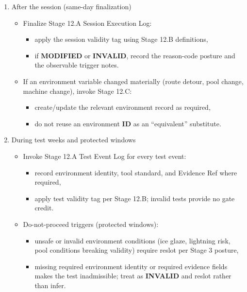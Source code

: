 \documentclass[10pt]{article}
\begin{document}
\begin{enumerate}
\item After the session (same-day finalization)
  \begin{itemize}
  \item Finalize Stage 12.A Session Execution Log:
    \begin{itemize}
    \item apply the session validity tag using Stage 12.B definitions,
    \item if \textbf{MODIFIED} or \textbf{INVALID}, record the reason-code posture and the observable trigger notes.
    \end{itemize}
  \item If an environment variable changed materially (route detour, pool change, machine change), invoke Stage 12.C:
    \begin{itemize}
    \item create/update the relevant environment record as required,
    \item do not reuse an environment \textbf{ID} as an “equivalent” substitute.
    \end{itemize}
  \end{itemize}

\item During test weeks and protected windows
  \begin{itemize}
  \item Invoke Stage 12.A Test Event Log for every test event:
    \begin{itemize}
    \item record environment identity, tool standard, and Evidence Ref where required,
    \item apply test validity tag per Stage 12.B; invalid tests provide no gate credit.
    \end{itemize}
  \item Do-not-proceed triggers (protected windows):
    \begin{itemize}
    \item unsafe or invalid environment conditions (ice glaze, lightning risk, pool conditions breaking validity) require reslot per Stage 3 posture,
    \item missing required environment identity or required evidence fields makes the test inadmissible; treat as \textbf{INVALID} and reslot rather than infer.
    \end{itemize}
  \end{itemize}


\end{enumerate}
\end{document}
